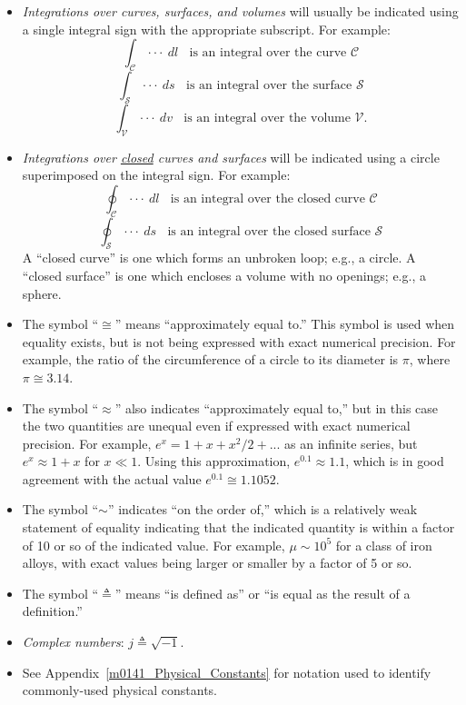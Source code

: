 \begin{itemize}
\item \emph{Integrations over curves, surfaces, and volumes} will usually be indicated using a single integral sign with the appropriate subscript. For example:
$$ \int_{\mathcal{C}} \cdot\cdot\cdot ~dl ~~~~ \mbox{is an integral over the curve $\mathcal{C}$}$$
$$ \int_{\mathcal{S}} \cdot\cdot\cdot ~ds ~~~~ \mbox{is an integral over the surface $\mathcal{S}$}$$  
$$ \int_{\mathcal{V}} \cdot\cdot\cdot ~dv ~~~~ \mbox{is an integral over the volume $\mathcal{V}$.}$$ 
\item \emph{Integrations over \underline{closed} curves and surfaces} will be indicated using a circle superimposed on the integral sign. For example: 
$$ \oint_{\mathcal{C}} \cdot\cdot\cdot ~dl ~~~~ \mbox{is an integral over the closed curve $\mathcal{C}$}$$
$$ \oint_{\mathcal{S}} \cdot\cdot\cdot ~ds ~~~~ \mbox{is an integral over the closed surface $\mathcal{S}$}$$ 
A ``closed curve'' is one which forms an unbroken loop; e.g., a circle.  
A ``closed surface'' is one which encloses a volume with no openings; e.g., a sphere.
\item The symbol ``$\cong$'' means ``approximately equal to.''  This symbol is used when equality exists, but is not being expressed with exact numerical precision.  For example, the ratio of the circumference of a circle to its diameter is $\pi$, where $\pi \cong 3.14$.
\item The symbol ``$\approx$'' also indicates ``approximately equal to,'' but in this case the two quantities are unequal even if expressed with exact numerical precision.  For example, $e^x = 1+x+x^2/2+...$ as an infinite series, but $e^x \approx 1+x$ for $x\ll 1$.  Using this approximation, $e^{0.1} \approx 1.1$, which is in good agreement with the actual value $e^{0.1} \cong 1.1052$. 
\item The symbol ``$\sim$'' indicates ``on the order of,'' which is a relatively weak statement of equality indicating that the indicated quantity is within a factor of 10 or so of the indicated value.  For example, $\mu\sim10^5$  for a class of iron alloys, with exact values being larger or smaller by a factor of 5 or so. 
\item The symbol ``$\triangleq$'' means ``is defined as'' or ``is equal as the result of a definition.''  
\item \emph{Complex numbers}: $j\triangleq\sqrt{-1}$.
\item See Appendix~\ref{m0141_Physical_Constants} for notation used to identify commonly-used physical constants.
\end{itemize}

